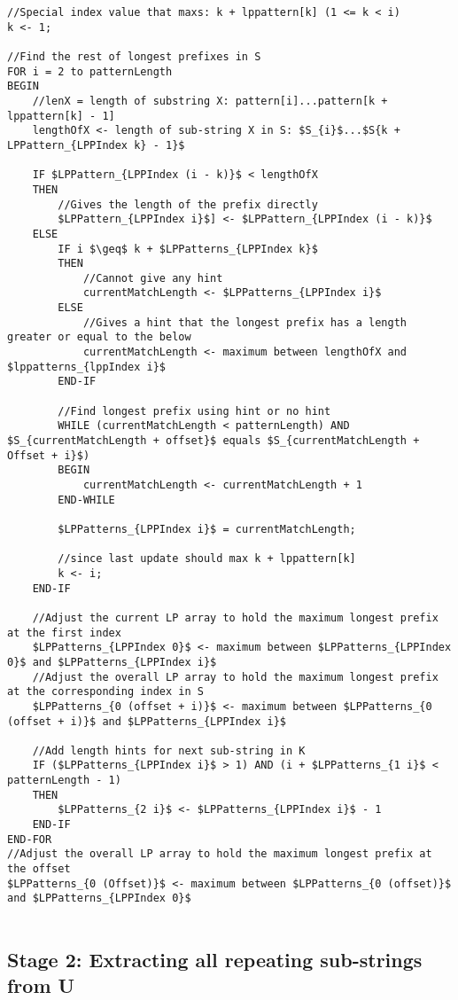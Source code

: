 \documentclass[12pt]{article}
\begin{document}
\begin{flushleft}
\begin{lstlisting}
//Special index value that maxs: k + lppattern[k] (1 <= k < i)
k <- 1;

//Find the rest of longest prefixes in S
FOR i = 2 to patternLength
BEGIN
	//lenX = length of substring X: pattern[i]...pattern[k + lppattern[k] - 1]
	lengthOfX <- length of sub-string X in S: $S_{i}$...$S{k + LPPattern_{LPPIndex k} - 1}$

	IF $LPPattern_{LPPIndex (i - k)}$ < lengthOfX
	THEN
		//Gives the length of the prefix directly
		$LPPattern_{LPPIndex i}$] <- $LPPattern_{LPPIndex (i - k)}$
	ELSE	
		IF i $\geq$ k + $LPPatterns_{LPPIndex k}$
		THEN
			//Cannot give any hint
			currentMatchLength <- $LPPatterns_{LPPIndex i}$
		ELSE
			//Gives a hint that the longest prefix has a length greater or equal to the below
			currentMatchLength <- maximum between lengthOfX and $lppatterns_{lppIndex i}$
		END-IF

		//Find longest prefix using hint or no hint
		WHILE (currentMatchLength < patternLength) AND $S_{currentMatchLength + offset}$ equals $S_{currentMatchLength + Offset + i}$)
		BEGIN
			currentMatchLength <- currentMatchLength + 1
		END-WHILE

		$LPPatterns_{LPPIndex i}$ = currentMatchLength;

		//since last update should max k + lppattern[k]
		k <- i;
	END-IF
	
	//Adjust the current LP array to hold the maximum longest prefix at the first index
	$LPPatterns_{LPPIndex 0}$ <- maximum between $LPPatterns_{LPPIndex 0}$ and $LPPatterns_{LPPIndex i}$
	//Adjust the overall LP array to hold the maximum longest prefix at the corresponding index in S
	$LPPatterns_{0 (offset + i)}$ <- maximum between $LPPatterns_{0 (offset + i)}$ and $LPPatterns_{LPPIndex i}$

	//Add length hints for next sub-string in K
	IF ($LPPatterns_{LPPIndex i}$ > 1) AND (i + $LPPatterns_{1 i}$ < patternLength - 1)
	THEN
		$LPPatterns_{2 i}$ <- $LPPatterns_{LPPIndex i}$ - 1
	END-IF
END-FOR
//Adjust the overall LP array to hold the maximum longest prefix at the offset
$LPPatterns_{0 (Offset)}$ <- maximum between $LPPatterns_{0 (offset)}$ and $LPPatterns_{LPPIndex 0}$


\end{lstlisting}
	\newpage	
	\subsection{Stage 2: Extracting all repeating sub-strings from U}
		

\end{flushleft}
\end{document}
